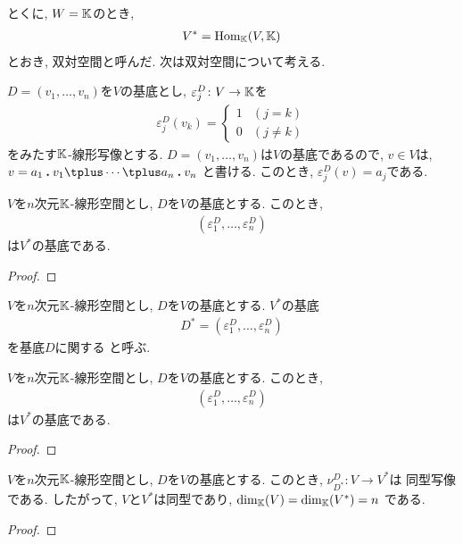 とくに,
$W=\mathbb{K}$のとき,
\begin{align*}
V^{\ast}=\operatorname{Hom}_{\mathbb{K}}(V,\mathbb{K})
\end{align*}
とおき, 双対空間と呼んだ.
次は双対空間について考える.

$D=(v_1,\ldots,v_n)$を$V$の基底とし,
$\varepsilon^{D}_j\colon V\to \mathbb{K}$を
\begin{align*}
\varepsilon^{D}_j (v_k)
=
\begin{cases}
1 & (j=k)\\
0 & (j\neq k)
\end{cases}
\end{align*}
をみたす$\mathbb{K}$-線形写像とする.
$D=(v_1,\ldots,v_n)$は$V$の基底であるので,
$v\in V$は, $v=a_1\act v_1\plus \cdots \plus a_n\act v_n$
と書ける. このとき,
$\varepsilon^{D}_j(v)=a_j$である.

\begin{prop}
$V$を$n$次元$\mathbb{K}$-線形空間とし,
$D$を$V$の基底とする.
このとき,
\begin{align*}
(\varepsilon^{D}_1,\ldots,\varepsilon^{D}_n)
\end{align*}
は$V^\ast$の基底である.
\end{prop}
\begin{proof}\end{proof}


\begin{definition}
$V$を$n$次元$\mathbb{K}$-線形空間とし,
$D$を$V$の基底とする.
$V^\ast$の基底
\begin{align*}
D^\ast=(\varepsilon^{D}_1,\ldots,\varepsilon^{D}_n)
\end{align*}
を基底$D$に関する
と呼ぶ.
\end{definition}


\begin{prop}
$V$を$n$次元$\mathbb{K}$-線形空間とし,
$D$を$V$の基底とする.
このとき,
\begin{align*}
(\varepsilon^{D}_1,\ldots,\varepsilon^{D}_n)
\end{align*}
は$V^\ast$の基底である.
\end{prop}
\begin{proof}\end{proof}
\begin{prop}
$V$を$n$次元$\mathbb{K}$-線形空間とし,
$D$を$V$の基底とする.
このとき,
$\nu^{D}_{D^\ast}\colon V\to V^\ast$は
同型写像である.
したがって, $V$と$V^\ast$は同型であり, $\dim_{\mathbb{K}}(V)=\dim_{\mathbb{K}}(V^\ast)=n$
である.
\end{prop}
\begin{proof}\end{proof}

